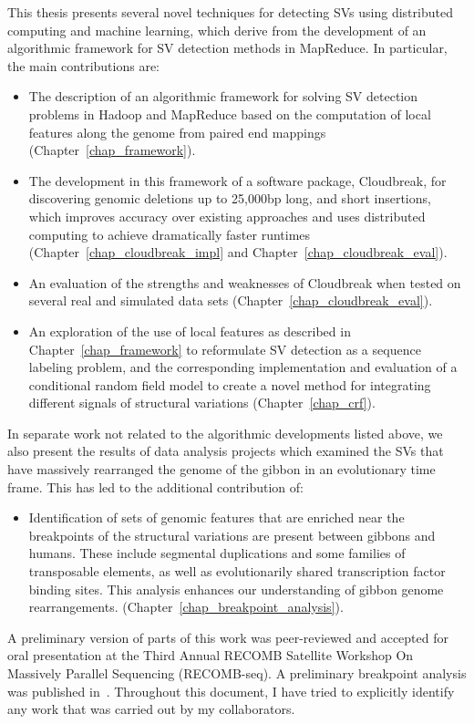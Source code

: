 This thesis presents several novel techniques for detecting SVs using distributed computing and machine learning, which derive from the development of an algorithmic framework for SV detection methods in MapReduce. In particular, the main contributions are:

\begin{itemize}
 \item The description of an algorithmic framework for solving SV detection problems in Hadoop and MapReduce based on the computation of local features along the genome from paired end mappings (Chapter~\ref{chap_framework}).
 \item The development in this framework of a software package, Cloudbreak, for discovering genomic deletions up to 25,000bp long, and short insertions, which improves accuracy over existing approaches and uses distributed computing to achieve dramatically faster runtimes (Chapter~\ref{chap_cloudbreak_impl} and Chapter~\ref{chap_cloudbreak_eval}).
 \item An evaluation of the strengths and weaknesses of Cloudbreak when tested on several real and simulated data sets (Chapter~\ref{chap_cloudbreak_eval}).
 \item An exploration of the use of local features as described in Chapter~\ref{chap_framework} to reformulate SV detection as a sequence labeling problem, and the corresponding implementation and evaluation of a conditional random field model to create a novel method for integrating different signals of structural variations (Chapter~\ref{chap_crf}).
\end{itemize}

In separate work not related to the algorithmic developments listed above, we also present the results of data analysis projects which examined the SVs that have massively rearranged the genome of the gibbon in an evolutionary time frame. This has led to the additional contribution of:

\begin{itemize}
 \item Identification of sets of genomic features that are enriched near the breakpoints of the structural variations are present between gibbons and humans. These include segmental duplications and some families of transposable elements, as well as evolutionarily shared transcription factor binding sites. This analysis enhances our understanding of gibbon genome rearrangements. (Chapter~\ref{chap_breakpoint_analysis}).
\end{itemize}

A preliminary version of parts of this work was peer-reviewed and accepted for oral presentation at the Third Annual RECOMB Satellite Workshop On Massively Parallel Sequencing (RECOMB-seq). A preliminary breakpoint analysis was published in~\cite{Capozzi:2012bb}. Throughout this document, I have tried to explicitly identify any work that was carried out by my collaborators.
